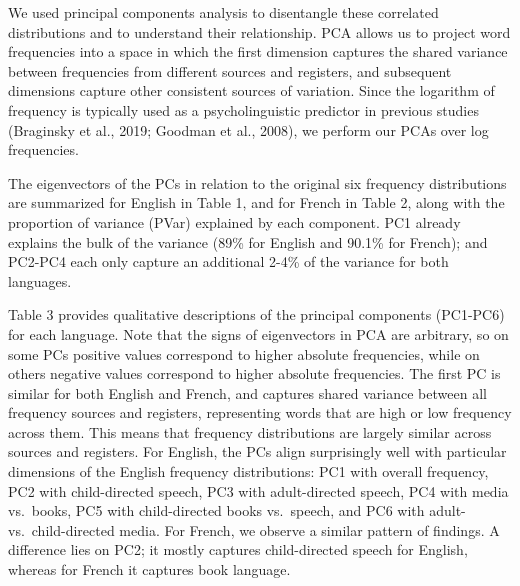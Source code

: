 \documentclass[10pt, letterpaper]{article}
\begin{document}
We used principal components analysis to disentangle these correlated
distributions and to understand their relationship. PCA allows us to
project word frequencies into a space in which the first dimension
captures the shared variance between frequencies from different sources
and registers, and subsequent dimensions capture other consistent
sources of variation. Since the logarithm of frequency is typically used
as a psycholinguistic predictor in previous studies (Braginsky et al.,
2019; Goodman et al., 2008), we perform our PCAs over log frequencies.

The eigenvectors of the PCs in relation to the original six frequency
distributions are summarized for English in Table 1, and for French in
Table 2, along with the proportion of variance (PVar) explained by each
component. PC1 already explains the bulk of the variance (89\% for
English and 90.1\% for French); and PC2-PC4 each only capture an
additional 2-4\% of the variance for both languages.

Table 3 provides qualitative descriptions of the principal components
(PC1-PC6) for each language. Note that the signs of eigenvectors in PCA
are arbitrary, so on some PCs positive values correspond to higher
absolute frequencies, while on others negative values correspond to
higher absolute frequencies. The first PC is similar for both English
and French, and captures shared variance between all frequency sources
and registers, representing words that are high or low frequency across
them. This means that frequency distributions are largely similar across
sources and registers. For English, the PCs align surprisingly well with
particular dimensions of the English frequency distributions: PC1 with
overall frequency, PC2 with child-directed speech, PC3 with
adult-directed speech, PC4 with media vs.~books, PC5 with child-directed
books vs.~speech, and PC6 with adult- vs.~child-directed media. For
French, we observe a similar pattern of findings. A difference lies on
PC2; it mostly captures child-directed speech for English, whereas for
French it captures book language.
\end{document}
